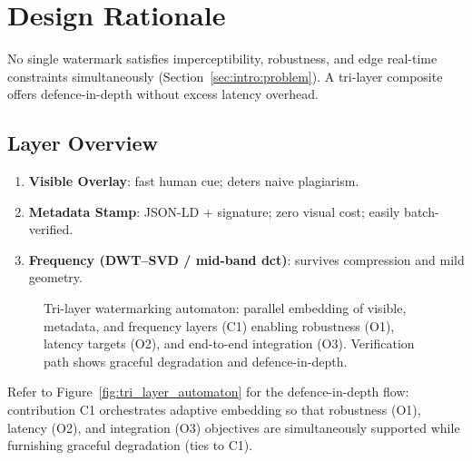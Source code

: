 \section{Design Rationale}
\label{sec:deep_dive:rationale}
No single watermark satisfies imperceptibility, robustness, and edge real-time constraints simultaneously (Section~\ref{sec:intro:problem}). A tri-layer composite offers defence-in-depth without excess latency overhead.

\subsection{Layer Overview}\label{subsec:layer-overview}
\begin{enumerate}
  \item \textbf{Visible Overlay}: fast human cue; deters naive plagiarism.
  \item \textbf{Metadata Stamp}: JSON-LD + signature; zero visual cost; easily batch-verified.
  \item \textbf{Frequency (DWT–SVD / mid-band \gls{dct})}: survives compression and mild geometry.
\end{enumerate}

\begin{figure}[ht]
  \centering
  
  \caption{Tri-layer watermarking automaton: parallel embedding of visible, metadata, and frequency layers (C1) enabling robustness (O1), latency targets (O2), and end-to-end integration (O3). Verification path shows graceful degradation and defence-in-depth.}\label{fig:figure}
\end{figure}

\noindent Refer to Figure~\ref{fig:tri_layer_automaton} for the defence-in-depth flow: contribution C1 orchestrates adaptive embedding so that robustness (O1), latency (O2), and integration (O3) objectives are simultaneously supported while furnishing graceful degradation (ties to C1).

